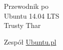 \thispagestyle{empty}


\colorbox{ubuntu_orange}{
	\parbox[t]{1.0\linewidth}{
		\centering \fontsize{40pt}{70pt}\selectfont
		\vspace*{0.7cm}
		
		\hfill Przewodnik po\\
		\hfill Ubuntu 14.04 LTS\\
		\hfill Trusty Thar\par
		
		\vspace*{0.7cm}
	}
}

\vfill


{
	\centering
	\large 
	\hfill Zespół \href{http://www.ubuntu.pl}{Ubuntu.pl} \\
}
\clearpage
